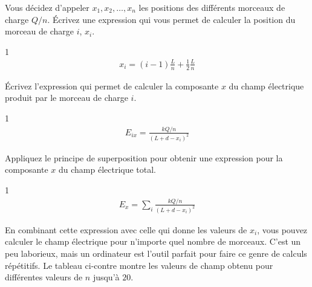 \documentclass{tufte-handout}
\def\reponse{1}
\begin{document}
Vous décidez d'appeler $x_1, x_2, \ldots, x_n$ les positions des différents
morceaux de charge $Q/n$. Écrivez une expression qui vous permet de calculer la
position du morceau de charge $i$, $x_i$.

\if\reponse1
  {\color{tblue}
    \begin{align*}
      x_{i} = (i - 1) \frac{L}{n} + \frac{1}{2}\frac{L}{n}
    \end{align*}
  }
\else
  \vspace{1cm}
\fi


Écrivez l'expression qui permet de calculer la composante $x$ du champ
électrique produit par le morceau de charge $i$.

\if\reponse1
  {\color{tblue}
    \begin{align*}
      E_{ix} = \frac{k Q/n}{(L + d - x_i)^2}
    \end{align*}
  }
\else
  \vspace{1cm}
\fi

Appliquez le principe de superposition pour obtenir une expression pour la
composante $x$ du champ électrique total.

\if\reponse1
  {\color{tblue}
    \begin{align*}
      E_{x} = \sum_i \frac{k Q/n}{(L + d - x_i)^2}
    \end{align*}
  }
\else
  \vspace{1cm}
\fi


En combinant cette expression avec celle qui donne les valeurs de $x_i$, vous
pouvez calculer le champ électrique pour n'importe quel nombre de morceaux.
C'est un peu laborieux, mais un ordinateur est l'outil parfait pour faire ce
genre de calculs répétitifs. Le tableau ci-contre montre les valeurs de champ
obtenu pour différentes valeurs de $n$ jusqu'à $20$.
\end{document}
